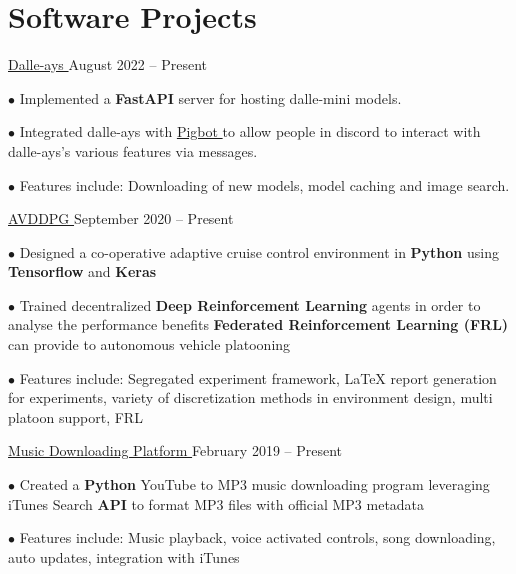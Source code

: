 \documentclass[a4paper,11pt]{article}
\newcommand{\github}{cboin1996} %
\newcommand{\sectionsep}{\vspace{-2.5mm}}
\begin{document}
\section{Software Projects}
\resumeSubHeadingListStart
\resumeProject
{\href{https://github.com/cboin1996/dalle-ays}{Dalle-ays \footnotesize{\faExternalLink}}} %
{August 2022 -- Present} %
\resumeItemListStart
\item[$\bullet$] Implemented a \textbf{FastAPI} server for hosting dalle-mini models.
\item[$\bullet$] Integrated dalle-ays with \href{https://github.com/cboin1996/pigbot}{Pigbot \footnotesize{\faExternalLink}}
to allow people in discord to interact with dalle-ays's various features via messages.
\item[$\bullet$] Features include: Downloading of new models, model caching and image search.

\resumeItemListEnd
\resumeProject
{\href{https://github.com/\github/avddpg}{AVDDPG \footnotesize{\faExternalLink}}}
{September 2020 -- Present} %
\resumeItemListStart
\item[$\bullet$] Designed a co-operative adaptive cruise control environment in \textbf{Python} using \textbf{Tensorflow} and
\textbf{Keras}
\item[$\bullet$] Trained decentralized \textbf{Deep Reinforcement Learning} agents in order to analyse the performance benefits \textbf{Federated Reinforcement Learning (FRL)}
can provide to autonomous vehicle platooning
\item[$\bullet$] Features include: Segregated experiment framework, \LaTeX \hspace{0.5pt} report generation for experiments,
variety of discretization methods in environment design, multi platoon support, FRL
\resumeItemListEnd

\resumeProject
{\href{https://github.com/cboin1996/JukeBox}{Music Downloading Platform \footnotesize{\faExternalLink}}} %
{February 2019 -- Present} %
\resumeItemListStart
\item[$\bullet$] Created a \textbf{Python} YouTube to MP3 music downloading program leveraging iTunes Search \textbf{API} to format
MP3 files with official MP3 metadata
\item[$\bullet$] Features include: Music playback, voice activated controls, song downloading, auto updates,
integration with iTunes
\resumeItemListEnd


\resumeSubHeadingListEnd
\sectionsep
\end{document}
